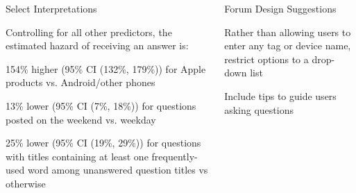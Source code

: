\documentclass[final]{beamer}
\newlength{\onecolwid}
\newlength{\twocolwid}
\begin{document}
\begin{frame}[t]
\begin{columns}[t]
\begin{column}{\twocolwid}


\begin{columns}[t,totalwidth=\twocolwid] %

\begin{column}{\onecolwid} %


\begin{block}{Select Interpretations}

Controlling for all other predictors, the estimated hazard of receiving an answer is:

\vspace{1ex}

\textcolor{dblue!70}{} 154\% higher (95\% CI (132\%, 179\%)) for Apple products vs. Android/other phones

\vspace{1ex}

\textcolor{dblue!70}{} 13\% lower (95\% CI (7\%, 18\%)) for questions posted on the weekend vs. weekday

\vspace{1ex}

\textcolor{dblue!70}{} 25\% lower (95\% CI (19\%, 29\%)) for questions with titles containing at least one frequently-used word among unanswered question titles vs otherwise

\end{block}


\end{column} %

\begin{column}{\onecolwid} %

\begin{block}{Forum Design Suggestions}

\textcolor{dblue!70}{} Rather than allowing users to enter any tag or device name, restrict options to a drop-down list

\vspace{0.75ex}

\textcolor{dblue!70}{} Include tips to guide users asking questions 

\end{block}


\end{column}
\end{columns}
\end{column}
\end{columns}
\end{frame}
\end{document}
